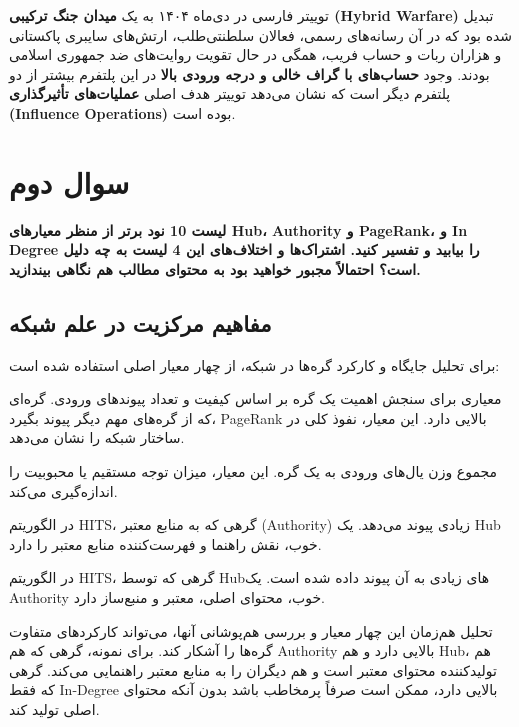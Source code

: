 \documentclass{article}
\begin{document}
 توییتر فارسی در دی‌ماه ۱۴۰۴ به یک \textbf{میدان جنگ ترکیبی (Hybrid Warfare)} تبدیل شده بود که در آن رسانه‌های رسمی، فعالان سلطنتی‌طلب، ارتش‌های سایبری پاکستانی و هزاران ربات و حساب فریب، همگی در حال تقویت روایت‌های ضد جمهوری اسلامی بودند. وجود \textbf{حساب‌های با گراف خالی و درجه ورودی بالا} در این پلتفرم بیشتر از دو پلتفرم دیگر است که نشان می‌دهد توییتر هدف اصلی \textbf{عملیات‌های تأثیرگذاری (Influence Operations)} بوده است.


\FloatBarrier
\section{سوال دوم}
\textbf{لیست 10 نود برتر از منظر معیارهای Hub، Authority و PageRank، و In Degree را بیابید و تفسیر کنید.
	اشتراک‌ها و اختلاف‌های این 4 لیست به چه دلیل است؟ احتمالاً مجبور خواهید بود به محتوای مطالب هم نگاهی بیندازید.}
\\
\subsection{مفاهیم مرکزیت در علم شبکه}
	برای تحلیل جایگاه و کارکرد گره‌ها در شبکه، از چهار معیار اصلی استفاده شده است:
	
	\begin{description}[style=nextline]
		\item[PageRank] معیاری برای سنجش اهمیت یک گره بر اساس کیفیت و تعداد پیوندهای ورودی. گره‌ای که از گره‌های مهم دیگر پیوند بگیرد، PageRank بالایی دارد. این معیار، نفوذ کلی در ساختار شبکه را نشان می‌دهد.
		\item[Weighted In-Degree (درجه ورودی وزن‌دار)] مجموع وزن یال‌های ورودی به یک گره. این معیار، میزان توجه مستقیم یا محبوبیت را اندازه‌گیری می‌کند.
		\item[Hub (مرکز)] در الگوریتم HITS، گرهی که به منابع معتبر (Authority) زیادی پیوند می‌دهد. یک Hub خوب، نقش راهنما و فهرست‌کننده منابع معتبر را دارد.
		\item[Authority (مرجع)] در الگوریتم HITS، گرهی که توسط Hubهای زیادی به آن پیوند داده شده است. یک Authority خوب، محتوای اصلی، معتبر و منبع‌ساز دارد.
	\end{description}
	
	تحلیل هم‌زمان این چهار معیار و بررسی هم‌پوشانی آنها، می‌تواند کارکردهای متفاوت گره‌ها را آشکار کند. برای نمونه، گرهی که هم Authority بالایی دارد و هم Hub، هم تولیدکننده محتوای معتبر است و هم دیگران را به منابع معتبر راهنمایی می‌کند. گرهی که فقط In-Degree بالایی دارد، ممکن است صرفاً پرمخاطب باشد بدون آنکه محتوای اصلی تولید کند.
	
\end{document}
